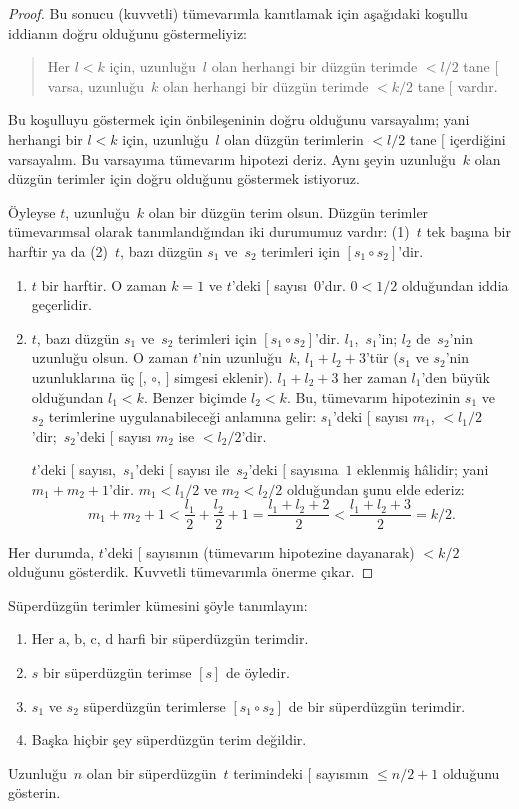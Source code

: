 \begin{proof}
Bu sonucu (kuvvetli) tümevarımla kanıtlamak için aşağıdaki koşullu
iddianın doğru olduğunu göstermeliyiz:
\begin{quote}
  Her $l < k$ için, uzunluğu~$l$ olan herhangi bir düzgün terimde $<
  l/2$ tane $[$ varsa, uzunluğu~$k$ olan herhangi bir düzgün terimde
  $< k/2$ tane $[$ vardır.
\end{quote}
Bu koşulluyu göstermek için önbileşeninin doğru olduğunu varsayalım;
yani herhangi bir $l<k$ için, uzunluğu~$l$ olan düzgün terimlerin $<
l/2$ tane $[$ içerdiğini varsayalım. Bu varsayıma tümevarım hipotezi
deriz. Aynı şeyin uzunluğu~$k$ olan düzgün terimler için doğru olduğunu
göstermek istiyoruz.

Öyleyse $t$, uzunluğu~$k$ olan bir düzgün terim olsun. Düzgün terimler
tümevarımsal olarak tanımlandığından iki durumumuz vardır: (1)~$t$ tek
başına bir harftir ya da (2)~$t$, bazı düzgün $s_1$ ve~$s_2$ terimleri
için $[s_1 \circ s_2]$'dir.
\begin{enumerate}
\item $t$ bir harftir. O zaman $k = 1$ ve $t$'deki $[$ sayısı~$0$'dır.
$0 < 1/2$ olduğundan iddia geçerlidir.
\item $t$, bazı düzgün $s_1$ ve~$s_2$ terimleri için $[s_1 \circ
  s_2]$'dir. $l_1$,~$s_1$'in; $l_2$ de~$s_2$'nin uzunluğu olsun.
  O zaman $t$'nin uzunluğu~$k$, $l_1+l_2+3$'tür ($s_1$ ve $s_2$'nin
  uzunluklarına üç $[$, $\circ$, $]$ simgesi eklenir).
  $l_1+l_2+3$ her zaman $l_1$'den büyük olduğundan $l_1 < k$.
  Benzer biçimde $l_2 < k$. Bu, tümevarım hipotezinin $s_1$ ve~$s_2$
  terimlerine uygulanabileceği anlamına gelir: $s_1$'deki $[$ sayısı
  $m_1$, $< l_1/2$'dir;~$s_2$'deki $[$ sayısı $m_2$ ise $< l_2/2$'dir.

  $t$'deki $[$ sayısı,~$s_1$'deki $[$ sayısı ile~$s_2$'deki $[$
  sayısına~$1$ eklenmiş hâlidir; yani $m_1 + m_2 + 1$'dir. $m_1 <
  l_1/2$ ve $m_2 < l_2/2$ olduğundan şunu elde ederiz:
  \[
  m_1 + m_2 + 1 < \frac{l_1}{2} + \frac{l_2}{2} + 1 = \frac{l_1+l_2+2}{2} < \frac{l_1+l_2+3}{2} = k/2.
  \]
\end{enumerate}
Her durumda, $t$'deki $[$ sayısının (tümevarım hipotezine dayanarak)
$< k/2$ olduğunu gösterdik. Kuvvetli tümevarımla önerme çıkar.
\end{proof}

\begin{prob}
  Süperdüzgün terimler kümesini şöyle tanımlayın:
  \begin{enumerate}
  \item Her $\mathrm{a}$, $\mathrm{b}$, $\mathrm{c}$, $\mathrm{d}$
    harfi bir süperdüzgün terimdir.
  \item $s$ bir süperdüzgün terimse $[s]$ de öyledir.
  \item $s_1$ ve $s_2$ süperdüzgün terimlerse $[s_1 \circ s_2]$ de
    bir süperdüzgün terimdir.
  \item Başka hiçbir şey süperdüzgün terim değildir.
  \end{enumerate}
  Uzunluğu~$n$ olan bir süperdüzgün~$t$ terimindeki $[$ sayısının
  $\le n/2 +1$ olduğunu gösterin.
\end{prob}

